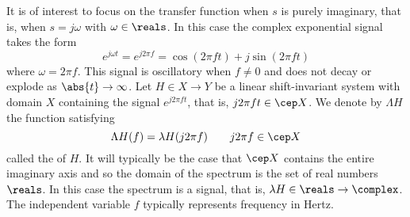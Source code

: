 It is of interest to focus on the transfer function when $s$ is purely imaginary, that is, when $s = j \omega$ with $\omega \in \reals$.  In this case the complex exponential signal takes the form
\[
e^{j\omega t} = e^{j 2\pi f} = \cos( 2\pi f t) + j \sin( 2\pi f t)
\] 
where $\omega = 2\pi f$.  This signal is oscillatory when $f \neq 0$ and does not decay or explode as $\abs{t} \rightarrow \infty$.  Let $H \in X \to Y$ be a linear shift-invariant system with domain $X$ containing the signal $e^{j 2\pi f t}$, that is, $j 2\pi f t \in \cep X$.  We denote by $\Lambda H$ the function satisfying
\[
\Lambda H(f) = \lambda H( j 2\pi f ) \qquad j 2\pi f \in \cep X
\]
called the  of $H$.  It will typically be the case that $\cep X$ contains the entire imaginary axis and so the domain of the spectrum is the set of real numbers $\reals$.  In this case  the spectrum is a signal, that is, $\lambda H \in \reals \to \complex$.  The independent variable $f$ typically represents frequency in Hertz. 

